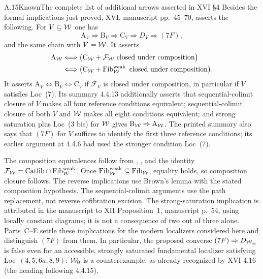 \begin{claim}{A.15}{Known}{The complete list of additional arrows asserted in XVI \S4}
Besides the formal implications just proved, XVI, manuscript pp.~45--70, asserts the following. For $V\subseteq\mathcal{W}$ one has
\[
\mathrm A_V\Rightarrow\mathrm B_V\Rightarrow\mathrm C_V\Rightarrow D_V\Rightarrow(7F),
\]
and the same chain with $V=\mathcal{W}$. It asserts
\[
\begin{aligned}
\mathrm A_{\mathcal{W}}&\Longleftrightarrow
\bigl(\mathrm C_{\mathcal{W}}+\mathcal F_{\mathcal{W}}\text{ closed under composition}\bigr)
\\
&\Longleftrightarrow
\bigl(\mathrm C_{\mathcal{W}}+\operatorname{Fib}^{\mathrm{weak}}_{\mathcal{W}}\text{ closed under composition}\bigr).
\end{aligned}
\]
It asserts $\mathrm A_V\Leftrightarrow\mathrm B_V\Leftrightarrow\mathrm C_V$ if $\mathcal F_V$ is closed under composition, in particular if $V$ satisfies Loc~(7). Its summary 4.4.13 additionally asserts that sequential-colimit closure of $V$ makes all four reference conditions equivalent; sequential-colimit closure of both $V$ and $\mathcal{W}$ makes all eight conditions equivalent; and strong saturation plus Loc~(3 bis) for $\mathcal{W}$ gives $\mathrm B_{\mathcal{W}}\Rightarrow\mathrm A_{\mathcal{W}}$. The printed summary also says that $(7F)$ for $V$ suffices to identify the first three reference conditions; its earlier argument at 4.4.6 had used the stronger condition Loc~(7).
\end{claim}
The composition equivalences follow from , , and the identity $\mathcal F_{\mathcal{W}}=\mathrm{Catfib}\cap\operatorname{Fib}^{\mathrm{weak}}_{\mathcal{W}}$. Once $\operatorname{Fib}^{\mathrm{weak}}_{\mathcal{W}}\subseteq\operatorname{Fib}_{\mathcal{W}}$, equality holds, so composition closure follows. The reverse implications use Brown's lemma with the stated composition hypothesis. The sequential-colimit arguments use the path replacement, not reverse cofibration excision. The strong-saturation implication is attributed in the manuscript to XII Proposition~1, manuscript p.~54, using locally constant diagrams; it is not a consequence of two out of three alone. Parts~C--E settle these implications for the modern localizers considered here and distinguish $(7F)$ from them. In particular, the proposed converse $(7F)\Rightarrow D_{\mathcal{W}_{\infty}}$ is false even for an accessible, strongly saturated fundamental localizer satisfying Loc~$(4,5,6a,8,9)$: $\mathcal{W}_0$ is a counterexample, as already recognized by XVI 4.16 (the heading following 4.4.15).

